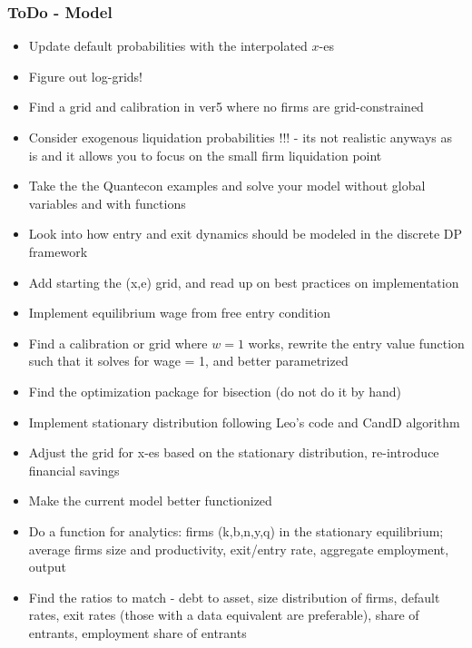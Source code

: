 \documentclass[12pt]{article}
\begin{document}
\newpage

\subsubsection*{ToDo - Model}
\begin{itemize}\setlength\itemsep{0em} \small
    \item Update default probabilities with the interpolated $x$-es \checkmark
    \item Figure out log-grids! \checkmark
    \item Find a grid and calibration in ver5 where no firms are grid-constrained \checkmark
    \item Consider exogenous liquidation probabilities !!! - its not realistic anyways as is and it allows you to focus on the small firm liquidation point \checkmark
    \item Take the the Quantecon examples and solve your model without global variables and with functions \checkmark
    \item Look into how entry and exit dynamics should be modeled in the discrete DP framework \checkmark
    \item Add starting the (x,e) grid, and read up on best practices on implementation \checkmark
    \item Implement equilibrium wage from free entry condition \checkmark
    \item Find a calibration or grid where $w=1$ works, rewrite the entry value function such that it solves for wage = 1, and better parametrized \checkmark
    \item Find the optimization package for bisection (do not do it by hand) \checkmark
    \item Implement stationary distribution following Leo's code and CandD algorithm \checkmark
    \item Adjust the grid for x-es based on the stationary distribution, re-introduce financial savings \checkmark
    \item Make the current model better functionized \checkmark
    \item Do a function for analytics: firms (k,b,n,y,q) in the stationary equilibrium; average firms size and productivity, exit/entry rate, aggregate employment, output \checkmark
    \item Find the ratios to match - debt to asset, size distribution of firms, default rates, exit rates (those with a data equivalent are preferable), share of entrants, employment share of  entrants \checkmark

\end{itemize}
\end{document}
